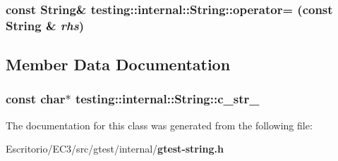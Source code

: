 \subsubsection{\setlength{\rightskip}{0pt plus 5cm}const {\bf String}\& testing::internal::String::operator= (const {\bf String} \& {\em rhs})\hspace{0.3cm}{\tt  [inline]}}\label{classtesting_1_1internal_1_1String_516ff53aa6228408d57347e43b2fc2c1}




\subsection{Member Data Documentation}
\subsubsection{\setlength{\rightskip}{0pt plus 5cm}const char$\ast$ {\bf testing::internal::String::c\_\-str\_\-}\hspace{0.3cm}{\tt  [private]}}\label{classtesting_1_1internal_1_1String_4d42145f96c6565f7e9d750f6f21f107}




The documentation for this class was generated from the following file:\begin{CompactItemize}
\item 
Escritorio/EC3/src/gtest/internal/{\bf gtest-string.h}\end{CompactItemize}
